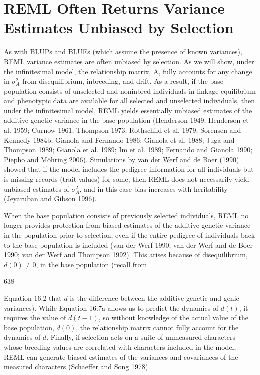 \documentclass{article}
\begin{document}
\section{REML Often Returns Variance Estimates Unbiased by Selection}
As with BLUPs and BLUEs (which assume the presence of known variances), REML variance estimates are often unbiased by selection. As we will show, under the infinitesimal model, the relationship matrix, A, fully accounts for any change in  $ \sigma_A^2 $ from disequilibrium, inbreeding, and drift. As a result, if the base population consists of unselected and noninbred individuals in linkage equilibrium and phenotypic data are available for all selected and unselected individuals, then under the infinitesimal model, REML yields essentially unbiased estimates of the additive genetic variance in the base population (Henderson 1949; Henderson et al. 1959; Curnow 1961; Thompson 1973; Rothschild et al. 1979; Sorensen and Kennedy 1984b; Gianola and Fernando 1986; Gianola et al. 1988; Juga and Thompson 1989; Gianola et al. 1989; Im et al. 1989; Fernando and Gianola 1990; Piepho and Möhring 2006). Simulations by van der Werf and de Boer (1990) showed that if the model includes the pedigree information for all individuals but is missing records (trait values) for some, then REML does not necessarily yield unbiased estimates of  $ \sigma_A^2 $, and in this case bias increases with heritability (Jeyaruban and Gibson 1996).

When the base population consists of previously selected individuals, REML no longer provides protection from biased estimates of the additive genetic variance in the population prior to selection, even if the entire pedigree of individuals back to the base population is included (van der Werf 1990; van der Werf and de Boer 1990; van der Werf and Thompson 1992). This arises because of disequilibrium,  $ d(0) \neq 0 $, in the base population (recall from

638

Equation 16.2 that $d$ is the difference between the additive genetic and genic variances). While Equation 16.7a allows us to predict the dynamics of $d(t)$, it requires the value of $d(t-1)$, so without knowledge of the actual value of the base population, $d(0)$, the relationship matrix cannot fully account for the dynamics of $d$. Finally, if selection acts on a suite of unmeasured characters whose breeding values are correlated with characters included in the model, REML can generate biased estimates of the variances and covariances of the measured characters (Schaeffer and Song 1978).
\end{document}
